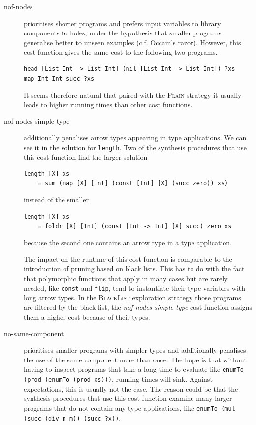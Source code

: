 \begin{description}
\item[nof-nodes] prioritises shorter programs and prefers input variables to library components to holes, under the hypothesis that smaller programs generalise better to unseen examples (c.f. Occam's razor). However, this cost function gives the same cost to the following two programs.
\begin{lstlisting}[style=plain]
head [List Int -> List Int] (nil [List Int -> List Int]) ?xs
map Int Int succ ?xs
\end{lstlisting}
It seems therefore natural that paired with the \textsc{Plain} strategy it usually leads to higher running times than other cost functions.

\item[nof-nodes-simple-type] additionally penalises arrow types appearing in type applications. We can see it in the solution for \lstinline?length?. Two of the synthesis procedures that use this cost function find the larger solution
\begin{lstlisting}
length [X] xs
    = sum (map [X] [Int] (const [Int] [X] (succ zero)) xs)
\end{lstlisting}
instead of the smaller
\begin{lstlisting}
length [X] xs
    = foldr [X] [Int] (const [Int -> Int] [X] succ) zero xs
\end{lstlisting}
because the second one contains an arrow type in a type application.

The impact on the runtime of this cost function is comparable to the introduction of pruning based on black lists. This has to do with the fact that polymorphic functions that apply in many cases but are rarely needed, like \lstinline?const? and \lstinline?flip?, tend to instantiate their type variables with long arrow types. In the \textsc{BlackList} exploration strategy those programs are filtered by the black list, the \textit{nof-nodes-simple-type} cost function assigns them a higher cost because of their types.

\item[no-same-component] prioritises smaller programs with simpler types and additionally penalises the use of the same component more than once. The hope is that without having to inspect programs that take a long time to evaluate like \lstinline?enumTo (prod (enumTo (prod xs)))?, running times will sink. Against expectations, this is usually not the case. The reason could be that the synthesis procedures that use this cost function examine many larger programs that do not contain any type applications, like \lstinline!enumTo (mul (succ (div n m)) (succ ?x))!.
\end{description}

